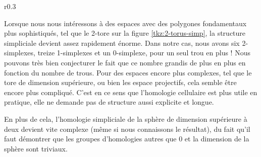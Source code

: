 \begin{wrapfigure}{r}{0.3\textwidth}
\centering
{}
\caption{\centering Structure simpliciale du 2-tore}
\label{tkz:2-torus-simp}
\end{wrapfigure}

Lorsque nous nous intéressons à des espaces avec des polygones fondamentaux plus sophistiqués, tel que le 2-tore sur la figure \ref{tkz:2-torus-simp}, la structure simpliciale devient assez rapidement énorme. Dans notre cas, nous avons six 2-simplexes, treize 1-simplexes et un 0-simplexe, pour un seul trou en plus ! Nous pouvons très bien conjecturer le fait que ce nombre grandis de plus en plus en fonction du nombre de trous. Pour des espaces encore plus complexes, tel que le tore de dimension supérieure, ou bien les espace projectifs, cela semble être encore plus compliqué. C'est en ce sens que l'homologie cellulaire est plus utile en pratique, elle ne demande pas de structure aussi explicite et longue.

\bigskip En plus de cela, l'homologie simpliciale de la sphère de dimension supérieure à deux devient vite complexe (même si nous connaissons le résultat), du fait qu'il faut démontrer que les groupes d'homologies autres que 0 et la dimension de la sphère sont triviaux.